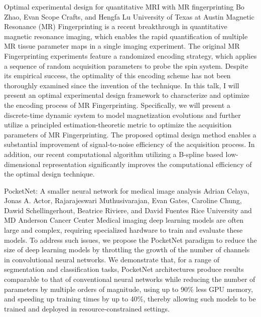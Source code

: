 \begin{addmargin}[2em]{0em}
\vspace{1.5ex}
\abs
{Optimal experimental design for quantitative MRI with MR fingerprinting}
{Bo Zhao, Evan Scope Crafts, and Hengfa Lu}
{University of Texas at Austin}
{Magnetic Resonance (MR) Fingerprinting is a recent breakthrough in quantitative magnetic resonance imaging, which enables the rapid quantification of multiple MR tissue parameter maps in a single imaging experiment. The original MR Fingerprinting experiments feature a randomized encoding strategy, which applies a sequence of random acquisition parameters to probe the spin system. Despite its empirical success, the optimality of this encoding scheme has not been thoroughly examined since the invention of the technique. In this talk, I will present an optimal experimental design framework to characterize and optimize the encoding process of MR Fingerprinting. Specifically, we will present a discrete-time dynamic system to model magnetization evolutions and further utilize a principled estimation-theoretic metric to optimize the acquisition parameters of MR Fingerprinting. The proposed optimal design method enables a substantial improvement of signal-to-noise efficiency of the acquisition process. In addition, our recent computational algorithm utilizing a B-spline based low-dimensional representation significantly improves the computational efficiency of the optimal design technique.}


\vspace{1.5ex}
\abs
{PocketNet: A smaller neural network for medical image analysis}
{Adrian Celaya, Jonas A. Actor, Rajarajeswari Muthusivarajan, Evan
Gates, Caroline Chung, Dawid Schellingerhout, Beatrice Riviere, and
David Fuentes}
{Rice University and MD Anderson Cancer Center}
{Medical imaging deep learning models are often large and complex,
requiring specialized hardware to train and evaluate these models. To
address such issues, we propose the PocketNet paradigm to reduce the
size of deep learning models by throttling the growth of the number of
channels in convolutional neural networks. We demonstrate that, for a
range of segmentation and classification tasks, PocketNet
architectures produce results comparable to that of conventional
neural networks while reducing the number of parameters by multiple
orders of magnitude, using up to 90\% less GPU memory, and speeding up
training times by up to 40\%, thereby allowing such models to be
trained and deployed in resource-constrained settings.}



\end{addmargin}
